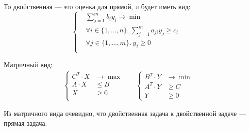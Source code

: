То двойственная --- это оценка для прямой, и будет иметь вид:
\[
    \left\{
    \begin{aligned}
        & \sum_{j=1}^m b_i y_i \to \min \\
        & \forall i \in \{1, \ldots, n\}.~\sum_{j=1}^m a_{ji} y_j \ge c_i \\
        & \forall j \in \{1, \ldots, m\}.~y_j \ge 0 \\
    \end{aligned}
    \right.
\]

Матричный вид:
\begin{align*}
    &
    \left\{
        \begin{aligned}
            C^T \cdot X & \to \max \\
            A \cdot X & \le B \\
            X & \ge 0 \\
        \end{aligned}
    \right.
    &&
    \left\{
        \begin{aligned}
            B^T \cdot Y & \to \min \\
            A^T \cdot Y & \ge C \\
            Y & \ge 0
        \end{aligned}
    \right.
\end{align*}

Из матричного вида очевидно,
что двойственная задача к двойственной задаче
--- прямая задача.
